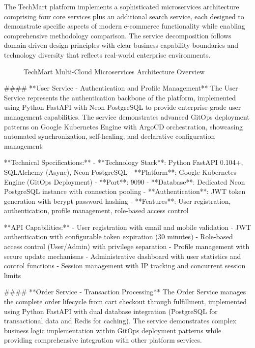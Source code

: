 The TechMart platform implements a sophisticated microservices architecture comprising four core services plus an additional search service, each designed to demonstrate specific aspects of modern e-commerce functionality while enabling comprehensive methodology comparison. The service decomposition follows domain-driven design principles with clear business capability boundaries and technology diversity that reflects real-world enterprise environments.

\begin{figure}[H]
\centering
\caption{TechMart Multi-Cloud Microservices Architecture Overview}
\label{fig:techmart-architecture-overview}
\end{figure}

#### **User Service - Authentication and Profile Management**
The User Service represents the authentication backbone of the platform, implemented using Python FastAPI with Neon PostgreSQL to provide enterprise-grade user management capabilities. The service demonstrates advanced GitOps deployment patterns on Google Kubernetes Engine with ArgoCD orchestration, showcasing automated synchronization, self-healing, and declarative configuration management.

**Technical Specifications:**
- **Technology Stack**: Python FastAPI 0.104+, SQLAlchemy (Async), Neon PostgreSQL
- **Platform**: Google Kubernetes Engine (GitOps Deployment)
- **Port**: 9090
- **Database**: Dedicated Neon PostgreSQL instance with connection pooling
- **Authentication**: JWT token generation with bcrypt password hashing
- **Features**: User registration, authentication, profile management, role-based access control

**API Capabilities:**
- User registration with email and mobile validation
- JWT authentication with configurable token expiration (30 minutes)
- Role-based access control (User/Admin) with privilege separation
- Profile management with secure update mechanisms
- Administrative dashboard with user statistics and control functions
- Session management with IP tracking and concurrent session limits

#### **Order Service - Transaction Processing**
The Order Service manages the complete order lifecycle from cart checkout through fulfillment, implemented using Python FastAPI with dual database integration (PostgreSQL for transactional data and Redis for caching). The service demonstrates complex business logic implementation within GitOps deployment patterns while providing comprehensive integration with other platform services.

